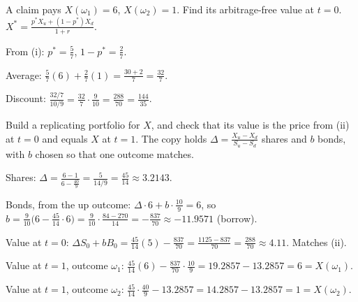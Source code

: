 \begin{problem}[Q5(b)(ii)]
A claim pays $X(\omega_1)=6$, $X(\omega_2)=1$. Find its arbitrage-free value at $t=0$.
\cardsays $X^*=\frac{p^*X_u+(1-p^*)X_d}{1+r}$.
\working
\begin{steps}
\item From (i): $p^*=\frac57$, $1-p^*=\frac27$.
\item Average: $\frac57(6)+\frac27(1)=\frac{30+2}7=\frac{32}7$.
\item Discount: $\frac{32/7}{10/9}=\frac{32}7\cdot\frac9{10}=\frac{288}{70}=\frac{144}{35}$.
\end{steps}
\end{problem}

\begin{problem}[Q5(b)(iii)]
Build a replicating portfolio for $X$, and check that its value is the price from (ii) at $t=0$ and equals $X$ at $t=1$.
\cardsays The copy holds $\Delta=\frac{X_u-X_d}{S_u-S_d}$ shares and $b$ bonds, with $b$ chosen so that one outcome matches.
\working
\begin{steps}
\item Shares: $\Delta=\frac{6-1}{6-\frac{40}9}=\frac{5}{14/9}=\frac{45}{14}\approx3.2143$.
\item Bonds, from the up outcome: $\Delta\cdot6+b\cdot\frac{10}9=6$, so $b=\frac{9}{10}\big(6-\frac{45}{14}\cdot6\big)=\frac9{10}\cdot\frac{84-270}{14}=-\frac{837}{70}\approx-11.9571$ (borrow).
\item Value at $t=0$: $\Delta S_0+bB_0=\frac{45}{14}(5)-\frac{837}{70}=\frac{1125-837}{70}=\frac{288}{70}\approx4.11$. Matches (ii).
\item Value at $t=1$, outcome $\omega_1$: $\frac{45}{14}(6)-\frac{837}{70}\cdot\frac{10}9=19.2857-13.2857=6=X(\omega_1)$.
\item Value at $t=1$, outcome $\omega_2$: $\frac{45}{14}\cdot\frac{40}9-13.2857=14.2857-13.2857=1=X(\omega_2)$.
\end{steps}
\end{problem}
